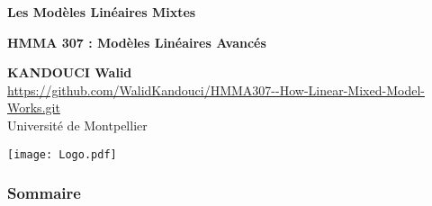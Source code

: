 \documentclass[unknownkeysallowed]{beamer}
\begin{document}
\begin{frame}[noframenumbering]
\thispagestyle{empty}
\bigskip
\bigskip
\begin{center}{
\LARGE\color{marron}
\textbf{Les Modèles Linéaires Mixtes}
\textbf{ }\\
\vspace{0.5cm}
}

\color{marron}
\textbf{HMMA 307 : Modèles Linéaires Avancés}
\end{center}

\vspace{0.5cm}

\begin{center}
\textbf{KANDOUCI Walid} \\
\vspace{0.1cm}
\url{https://github.com/WalidKandouci/HMMA307--How-Linear-Mixed-Model-Works.git}\\
\vspace{0.5cm}
Université de Montpellier \\
\end{center}

\centering
\texttt{[image: Logo.pdf]}
\end{frame}








\begin{frame}
\frametitle{Sommaire}
\tableofcontents
\end{frame}
\end{document}

